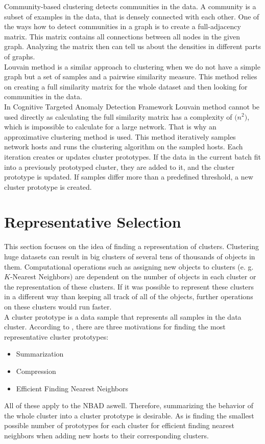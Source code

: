 \documentclass[thesis=B,english]{FITthesis}[2012/10/20]
\begin{document}
Community-based clustering detects communities in the data.
A community is a subset of examples in the data, that is densely connected with each other.
One of the ways how to detect communities in a graph is to create a full-adjacency matrix.
This matrix contains all connections between all nodes in the given graph.
Analyzing the matrix then can tell us about the densities in different parts of graphs.\\

Louvain method is a similar approach to clustering when we do not have a simple graph but a set of samples and a pairwise similarity measure.
This method relies on creating a full similarity matrix for the whole dataset and then looking for communities in the data. \\

In Cognitive Targeted Anomaly Detection Framework Louvain method cannot be used directly as calculating the full similarity matrix has a complexity of $\mathcal(n^2)$, which is impossible to calculate for a large network.
That is why an approximative clustering method is used.
This method iteratively samples network hosts and runs the clustering algorithm on the sampled hosts.
Each iteration creates or updates cluster prototypes.
If the data in the current batch fit into a previously prototyped cluster, they are added to it, and the cluster prototype is updated.
If samples differ more than a predefined threshold, a new cluster prototype is created.

\section{Representative Selection}

This section focuses on the idea of finding a representation of clusters.
Clustering huge datasets can result in big clusters of several tens of thousands of objects in them.
Computational operations such as assigning new objects to clusters (e. g. $K$-Nearest Neighbors) are dependent on the number of objects in each cluster or the representation of these clusters.
If it was possible to represent these clusters in a different way than keeping all track of all of the objects, further operations on these clusters would run faster. \\

A cluster prototype is a data sample that represents all samples in the data cluster.
According to , there are three motivations for finding the most representative cluster prototypes:
\begin{itemize}
    \item Summarization
    \item Compression
    \item Efficient Finding Nearest Neighbors
\end{itemize}
All of these apply to the NBAD aswell.
Therefore, summarizing the behavior of the whole cluster into a cluster prototype is desirable.
As is finding the smallest possible number of prototypes for each cluster for efficient finding nearest neighbors when adding new hosts to their corresponding clusters. \\
\end{document}
